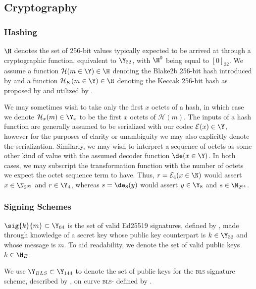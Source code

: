 \subsection{Cryptography}\label{sec:cryptography}

\subsubsection{Hashing}

$\H$ denotes the set of 256-bit values typically expected to be arrived at through a cryptographic function, equivalent to $\Y_{32}$, with $\H^0$ being equal to $[0]_{32}$. We assume a function $\mathcal{H}(m \in \Y) \in \H$ denoting the Blake2b 256-bit hash introduced by \cite{rfc7693} and a function $\mathcal{H}_K(m \in \Y) \in \H$ denoting the Keccak 256-bit hash as proposed by \cite{bertoni2013keccak} and utilized by \cite{wood2014ethereum}.

We may sometimes wish to take only the first $x$ octets of a hash, in which case we denote $\mathcal{H}_x(m) \in \Y_x$ to be the first $x$ octets of $\mathcal{H}(m)$. The inputs of a hash function are generally assumed to be serialized with our codec $\mathcal{E}(x) \in \Y$, however for the purposes of clarity or unambiguity we may also explicitly denote the serialization. Similarly, we may wish to interpret a sequence of octets as some other kind of value with the assumed decoder function $\de(x \in \Y)$. In both cases, we may subscript the transformation function with the number of octets we expect the octet sequence term to have. Thus, $r = \mathcal{E}_4(x \in \N)$ would assert $x \in \N_{2^{32}}$ and $r \in \Y_4$, whereas $s = \de_8(y)$ would assert $y \in \Y_8$ and $s \in \N_{2^{64}}$.

\subsubsection{Signing Schemes}\label{sec:signing}

$\sig{k}{m} \subset \Y_{64}$ is the set of valid Ed25519 signatures, defined by \cite{rfc8032}, made through knowledge of a secret key whose public key counterpart is $k \in \Y_{32}$ and whose message is $m$. To aid readability, we denote the set of valid public keys $k \in \H_E$.

We use $\Y_{BLS} \subset \Y_{144}$ to denote the set of public keys for the \textsc{bls} signature scheme, described by \cite{jofc-2004-14130}, on curve \textsc{bls}- defined by \cite{bls12-381}.


